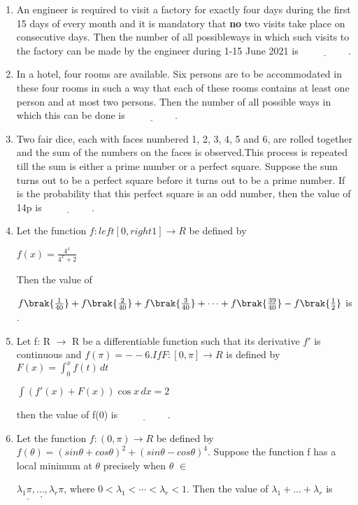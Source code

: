 \documentclass{article}
\begin{document}
\begin{enumerate}
(B) $( g(m, n + 1) = g(m + 1, n) )$ for all positiveintegers $( m, n )$  

(C) $( g(2m, 2n) = 2 g(m, n) )$ for all positive integers $( m, n )$  

(D) $( g(2m, 2n) = (g(m, n))^2 )$ for all positive integers $( m, n )$

\item An engineer is required to visit a factory for exactly four days during the first 15 days of every month and it is mandatory that \textbf{no} two visits take place on consecutive days. Then the number of all possibleways in which such visits to the factory can be made by the engineer during 1-15 June 2021 is $\underline{\hspace{2cm}}.$

\item In a hotel, four rooms are available. Six persons are to be accommodated in these four rooms in such a way that each of these rooms contains at least one person and at most two persons. Then the number of all possible ways in which this can be done is $\underline{\hspace{2cm}}.$

\item Two fair dice, each with faces numbered 1, 2, 3, 4, 5 and 6, are rolled together and the sum of the numbers on the faces is observed.This process is repeated till the sum is either a prime number or a perfect square. Suppose the sum turns out to be a perfect square before it turns out to be a prime number. If  is the probability that this perfect square is an odd number, then the value of 14p is $\underline{\hspace{2cm}}.$

\item Let the function $f:left[0, right1] \to R$ be defined by

      $f(x) = \frac{4^x}{4^x + 2}$
      
Then the value of
      
	$f\brak{\frac{1}{40}} + f\brak{\frac{2}{40}} + f\brak{\frac{3}{40}} + \dots + f\brak{\frac{39}{40}} - f\brak{\frac{1}{2}}$ 
	is \underline{\hspace{2cm}}.

\item Let f: R $\to$ R be a differentiable function such that its derivative $f'$ is continuous and $f(\pi) = --6.If F:[0,\pi] \to R $ is defined by $F(x) = \int_{0}^{x}f(t) \, dt$
    
    $\int ( f'(x) + F(x) ) \cos x \, dx = 2$

then the value of f(0) is $\underline{\hspace{2cm}}$.

\item Let the function $f: (0, \pi) \to R$ be defined by
      $f(\theta) = (sin\theta + cos\theta)^2 + (sin\theta - cos\theta)^4.$
      Suppose the function f has a local minimum at $\theta$ precisely when $\theta$ $\in$
       
       ${ \lambda_1 \pi, \dots, \lambda_r \pi}$, where  $0<\lambda_1 < \cdots < \lambda_r < 1$. Then the value of $\lambda_1 + \dots + \lambda_r$ is $\underline{\hspace{1cm}}.$
\end{enumerate}
     
\end{document}
